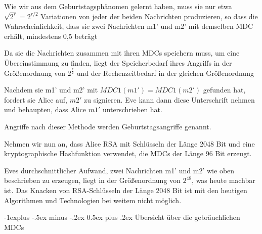 \documentclass[a4paper]{article}
\makeatletter
\renewcommand{\subsection}{\@startsection{subsection}{2}{0mm}%
 {-1explus -.5ex minus -.2ex}%
 {0.5ex plus .2ex}%
 {\normalfont\normalsize\bfseries}}
\makeatother
\begin{document}
\begin{multicols}{3}
\begin{itemize*}
\begin{itemize*}
            \end{itemize*}
            \item Wie wir aus dem Geburtstagsphänomen gelernt haben, muss sie nur etwa
            $\sqrt{2^r}=2^{r/2}$ Variationen von jeder
            der beiden Nachrichten produzieren, so dass die Wahrscheinlichkeit,
            dass sie zwei Nachrichten m1' und m2' mit demselben MDC erhält,
            mindestens 0,5 beträgt
            \item Da sie die Nachrichten zusammen mit ihren MDCs speichern muss, um eine
            Übereinstimmung zu finden, liegt der Speicherbedarf ihres Angriffs in
            der Größenordnung von $2^{\frac{r}{2}}$ und
            der Rechenzeitbedarf in der gleichen Größenordnung
            \item Nachdem sie m1' und m2' mit $MDC1(m1')=MDC1(m2')$ gefunden hat,
            fordert sie Alice auf, $m2'$ zu signieren. Eve kann dann diese
            Unterschrift nehmen und behaupten, dass Alice $m1'$ unterschrieben
            hat.
            \item Angriffe nach dieser Methode werden Geburtstagsangriffe genannt.
            \item Nehmen wir nun an, dass Alice RSA mit Schlüsseln der Länge 2048 Bit
            und eine kryptographische Hashfunktion verwendet, die MDCs der Länge
            96 Bit erzeugt.
            \begin{itemize*}
                  \item Eves durchschnittlicher Aufwand, zwei Nachrichten m1' und m2' wie oben beschrieben zu erzeugen, liegt in der Größenordnung von $2^{48}$, was heute machbar ist. Das Knacken von RSA-Schlüsseln der Länge 2048 Bit ist mit den heutigen Algorithmen und Technologien bei weitem nicht möglich.
            \end{itemize*}
      \end{itemize*}


      \subsection{Übersicht über die gebräuchlichen
            MDCs}


\end{multicols}
\end{document}
